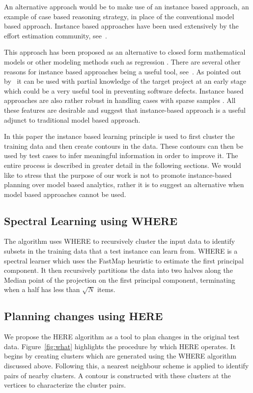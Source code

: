 \documentclass[conference]{IEEEtran}
\begin{document}
An alternative approach would be to make use of an instance based approach, an example of case based reasoning strategy, in place of the conventional model based approach. Instance based approaches have been used extensively by the effort estimation community, see~\cite{keung2008analogy, 6600685, walkerden1999empirical, shepperd1997estimating, kocaguneli2010use}. 

This approach has been proposed as an alternative to closed form mathematical models or other modeling methods such as regression \cite{keung2008analogy}. There are several other reasons for instance based approaches being a useful tool, see~\cite{6600685}. As pointed out by~\cite{walkerden1999empirical} it can be used with partial knowledge of the target project at an early stage which could be a very useful tool in preventing software defects. Instance based approaches are also rather robust in handling cases with sparse samples \cite{1438374}. All these features are desirable and suggest that instance-based approach is a useful adjunct to traditional model based approach. 

In this paper the instance based learning principle is used to first cluster the training data and then create contours in the data. These contours can then be used by test cases to infer meaningful information in order to improve it. The entire process is described in greater detail in the following sections. We would like to stress that the purpose of our work is not to promote instance-based planning over model based analytics, rather it is to suggest an alternative when model based approaches cannot be used.

\subsection{Spectral Learning using WHERE}
The algorithm uses WHERE to recursively cluster the input data to identify subsets in the training data that a test instance can learn from. WHERE is a spectral learner which uses the FastMap heuristic to estimate the first principal component. It then recursively partitions the data into two halves along the Median point of the projection on the first principal component, terminating when a half has less than $\sqrt{N}$ items.   

\subsection{Planning changes using HERE}
We propose the HERE algorithm as a tool to plan changes in the original test data. Figure~\ref{fig:what} highlights the procedure by which HERE operates. It begins by creating clusters which are generated using the WHERE algorithm discussed above. Following this, a nearest neighbour scheme is applied to identify pairs of nearby clusters. A contour is constructed with these clusters at the vertices to characterize the cluster pairs.
\end{document}
